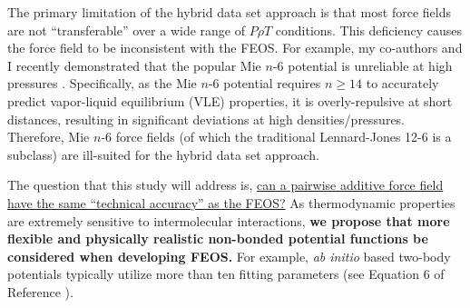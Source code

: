 \documentclass[12pt,a4paper]{article}
\begin{document}
 
 

The primary limitation of the hybrid data set approach is that most force fields are not ``transferable'' over a wide range of $P \rho T$ conditions. This deficiency causes the force field to be inconsistent with the FEOS. For example, my co-authors and I recently demonstrated that the popular Mie $n$-6 potential is unreliable at high pressures \cite{Messerly2018_2}. Specifically, as the Mie $n$-6 potential requires $n \ge 14$ to accurately predict vapor-liquid equilibrium (VLE) properties, it is overly-repulsive at short distances, resulting in significant deviations at high densities/pressures. Therefore, Mie $n$-6 force fields (of which the traditional Lennard-Jones 12-6 is a subclass) are ill-suited for the hybrid data set approach.

The question that this study will address is, \ul{can a pairwise additive force field have the same ``technical accuracy'' as the FEOS?} As thermodynamic properties are extremely sensitive to intermolecular interactions, \textbf{we propose that more flexible and physically realistic non-bonded potential functions be considered when developing FEOS.} For example, \textit{ab initio} based two-body potentials typically utilize more than ten fitting parameters (see Equation 6 of Reference ). 
\end{document}
